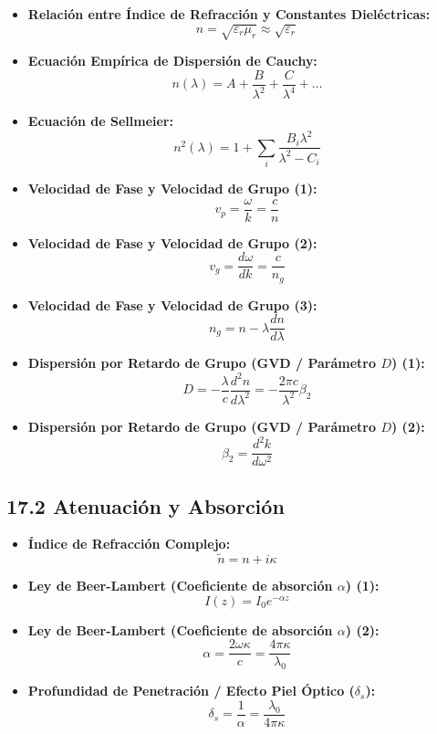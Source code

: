 \documentclass[11pt,a4paper]{article}
\begin{document}
\begin{itemize}
  \item \textbf{Relación entre Índice de Refracción y Constantes Dieléctricas:}
  \[
    n = \sqrt{\varepsilon_r \mu_r} \approx \sqrt{\varepsilon_r}
  \]
  \item \textbf{Ecuación Empírica de Dispersión de Cauchy:}
  \[
    n(\lambda) = A + \frac{B}{\lambda^2} + \frac{C}{\lambda^4} + \dots
  \]
  \item \textbf{Ecuación de Sellmeier:}
  \[
    n^2(\lambda) = 1 + \sum_{i} \frac{B_i \lambda^2}{\lambda^2 - C_i}
  \]
  \item \textbf{Velocidad de Fase y Velocidad de Grupo (1):}
  \[
    v_p = \frac{\omega}{k} = \frac{c}{n}
  \]
  \item \textbf{Velocidad de Fase y Velocidad de Grupo (2):}
  \[
    v_g = \frac{d\omega}{dk} = \frac{c}{n_g}
  \]
  \item \textbf{Velocidad de Fase y Velocidad de Grupo (3):}
  \[
    n_g = n - \lambda \frac{dn}{d\lambda}
  \]
  \item \textbf{Dispersión por Retardo de Grupo (GVD / Parámetro $D$) (1):}
  \[
    D = -\frac{\lambda}{c} \frac{d^2 n}{d\lambda^2} = -\frac{2\pi c}{\lambda^2} \beta_2
  \]
  \item \textbf{Dispersión por Retardo de Grupo (GVD / Parámetro $D$) (2):}
  \[
    \beta_2 = \frac{d^2 k}{d\omega^2}
  \]
\end{itemize}

\subsection*{17.2 Atenuación y Absorción}

\begin{itemize}
  \item \textbf{Índice de Refracción Complejo:}
  \[
    \tilde{n} = n + i \kappa
  \]
  \item \textbf{Ley de Beer-Lambert (Coeficiente de absorción $\alpha$) (1):}
  \[
    I(z) = I_0 e^{-\alpha z}
  \]
  \item \textbf{Ley de Beer-Lambert (Coeficiente de absorción $\alpha$) (2):}
  \[
    \alpha = \frac{2\omega\kappa}{c} = \frac{4\pi\kappa}{\lambda_0}
  \]
  \item \textbf{Profundidad de Penetración / Efecto Piel Óptico ($\delta_s$):}
  \[
    \delta_s = \frac{1}{\alpha} = \frac{\lambda_0}{4\pi\kappa}
  \]
\end{itemize}
\end{document}
